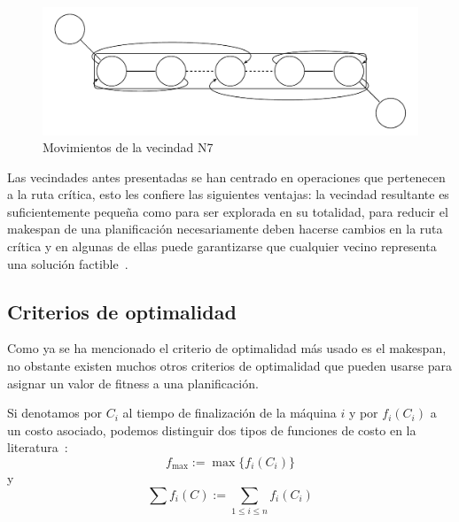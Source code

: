\begin{itemize}
\begin{figure}[H]
\centering
\includegraphics[scale=.7]{Imagenes/N7.pdf}
\caption{Movimientos de la vecindad N7}
\end{figure}
\end{itemize}

Las vecindades antes presentadas se han centrado en operaciones que pertenecen a la ruta crítica, esto les confiere las siguientes ventajas: la vecindad resultante es 
suficientemente pequeña como para ser explorada en su totalidad, para reducir el makespan de una planificación necesariamente deben hacerse cambios en la ruta crítica 
y en algunas de ellas puede garantizarse que cualquier vecino representa una solución factible~\cite{balas1969machine}.

%

\subsection*{Criterios de optimalidad}
Como ya se ha mencionado el criterio de optimalidad más usado es el makespan, no obstante existen muchos otros criterios de optimalidad que pueden usarse para 
asignar un valor de fitness a una planificación. 

Si denotamos por $C_i$ al tiempo de finalización de la máquina $i$ y por $f_i(C_i)$ a un costo asociado, podemos distinguir dos tipos de funciones de 
costo en la literatura~\cite{Brucker2001}:
\[f_{\max}:=\max\{f_i(C_i)\}\]
y 
\[\sum f_i(C):=\sum_{1\leq i\leq n}f_i(C_i)\]

